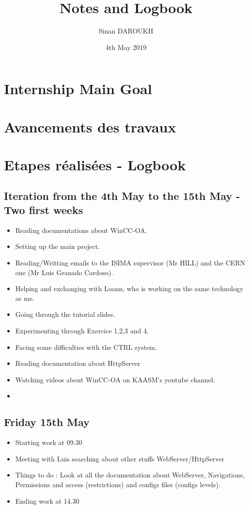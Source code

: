 \documentclass[a4paper, 10pt]{article}
\title{Notes and Logbook}
\author{Sinan DAROUKH}
\date{4th May 2019}
\begin{document}
\begin{titlepage}
\maketitle
\end{titlepage}

\tableofcontents
\newpage

\section{Internship Main Goal}
\section{Avancements des travaux}
\section{Etapes réalisées - Logbook}
\footnotesize
\subsection*{Iteration from the 4th May to the 15th May - Two first weeks}
\begin{itemize}
    \item Reading documentations about WinCC-OA.
    \item Setting up the main project.
    \item Reading/Writting emails to the ISIMA supervisor (Mr HILL) and the CERN one (Mr Luis Granado Cardoso).
    \item Helping and exchanging with Loann, who is working on the same technology as me.
    \item Going through the tutorial slides.
    \item Experimenting through Exercice 1,2,3 and 4.
    \item Facing some difficulties with the CTRL system.
    \item Reading documentation about HttpServer
    \item Watching videos about WinCC-OA on KAASM's youtube channel.
    \item 
\end{itemize}



\subsection*{Friday 15th May}
\begin{itemize}
    \item Starting work at 09.30
    \item Meeting with Luis searching about other stuffs WebServer/HttpServer
    \item Things to do : Look at all the documentation about WebServer, Navigations, Permissions and access (restrictions) and configs files (configs levels).
    \item Ending work at 14.30
\end{itemize}
\end{document}
